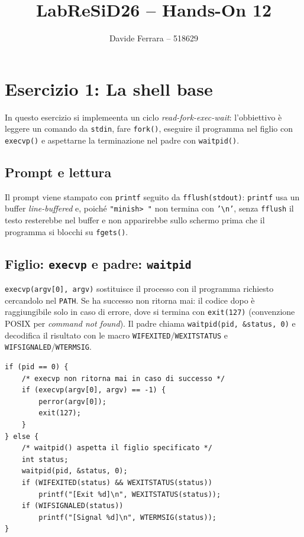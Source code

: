 \documentclass[a4paper,12pt]{article}
\title{LabReSiD26 -- Hands-On 12}
\author{Davide Ferrara -- 518629}
\date{}
\begin{document}
\maketitle

\section{Esercizio 1: La shell base}

In questo esercizio si implemeenta un ciclo \emph{read-fork-exec-wait}:
l'obbiettivo è leggere un comando da \texttt{stdin},
fare \texttt{fork()}, eseguire il programma nel figlio con
\texttt{execvp()} e aspettarne la terminazione nel
padre con \texttt{waitpid()}.

\subsection*{Prompt e lettura}

Il prompt viene stampato con \texttt{printf} seguito da \texttt{fflush(stdout)}:
\texttt{printf} usa un buffer \emph{line-buffered} e, poiché \texttt{"minish> "}
non termina con \texttt{'\textbackslash n'}, senza \texttt{fflush} il testo
resterebbe nel buffer e non apparirebbe sullo schermo prima che il programma
si blocchi su \texttt{fgets()}.

\subsection*{Figlio: \texttt{execvp} e padre: \texttt{waitpid}}

\texttt{execvp(argv[0], argv)} sostituisce il processo con il
programma richiesto cercandolo nel \texttt{PATH}. Se ha successo non ritorna
mai: il codice dopo è raggiungibile solo in caso di errore, dove si termina
con \texttt{exit(127)} (convenzione POSIX per \emph{command not found}).
Il padre chiama \texttt{waitpid(pid, \&status, 0)} e decodifica il risultato
con le macro \texttt{WIFEXITED}/\texttt{WEXITSTATUS} e
\texttt{WIFSIGNALED}/\texttt{WTERMSIG}.

\begin{lstlisting}[caption={Figlio ed padre -- parti cruciali}]
if (pid == 0) {
    /* execvp non ritorna mai in caso di successo */
    if (execvp(argv[0], argv) == -1) {
        perror(argv[0]);
        exit(127);
    }
} else {
    /* waitpid() aspetta il figlio specificato */
    int status;
    waitpid(pid, &status, 0);
    if (WIFEXITED(status) && WEXITSTATUS(status))
        printf("[Exit %d]\n", WEXITSTATUS(status));
    if (WIFSIGNALED(status))
        printf("[Signal %d]\n", WTERMSIG(status));
}
\end{lstlisting}
\end{document}
